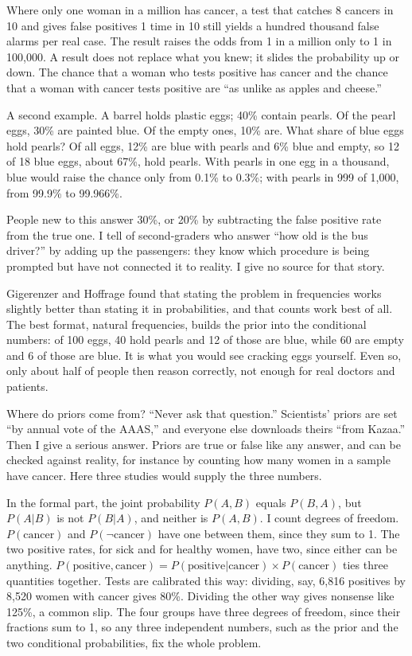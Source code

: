 Where only one woman in a million has cancer, a test that catches 8 cancers in 10 and gives false positives 1 time in 10 still yields a hundred thousand false alarms per real case. The result raises the odds from 1 in a million only to 1 in 100,000. A result does not replace what you knew; it slides the probability up or down. The chance that a woman who tests positive has cancer and the chance that a woman with cancer tests positive are ``as unlike as apples and cheese.''

A second example. A barrel holds plastic eggs; 40\% contain pearls. Of the pearl eggs, 30\% are painted blue. Of the empty ones, 10\% are. What share of blue eggs hold pearls? Of all eggs, 12\% are blue with pearls and 6\% blue and empty, so 12 of 18 blue eggs, about 67\%, hold pearls. With pearls in one egg in a thousand, blue would raise the chance only from 0.1\% to 0.3\%; with pearls in 999 of 1,000, from 99.9\% to 99.966\%.

People new to this answer 30\%, or 20\% by subtracting the false positive rate from the true one. I tell of second-graders who answer ``how old is the bus driver?'' by adding up the passengers: they know which procedure is being prompted but have not connected it to reality. I give no source for that story.

Gigerenzer and Hoffrage found that stating the problem in frequencies works slightly better than stating it in probabilities, and that counts work best of all.  The best format, natural frequencies, builds the prior into the conditional numbers: of 100 eggs, 40 hold pearls and 12 of those are blue, while 60 are empty and 6 of those are blue. It is what you would see cracking eggs yourself. Even so, only about half of people then reason correctly, not enough for real doctors and patients.

Where do priors come from? ``Never ask that question.'' Scientists' priors are set ``by annual vote of the AAAS,'' and everyone else downloads theirs ``from Kazaa.'' Then I give a serious answer. Priors are true or false like any answer, and can be checked against reality, for instance by counting how many women in a sample have cancer. Here three studies would supply the three numbers. 

In the formal part, the joint probability $P(A,B)$ equals $P(B,A)$, but $P(A|B)$ is not $P(B|A)$, and neither is $P(A,B)$. I count degrees of freedom. $P(\mathrm{cancer})$ and $P(\neg\mathrm{cancer})$ have one between them, since they sum to 1. The two positive rates, for sick and for healthy women, have two, since either can be anything. $P(\mathrm{positive},\mathrm{cancer}) = P(\mathrm{positive}|\mathrm{cancer}) \times P(\mathrm{cancer})$ ties three quantities together. Tests are calibrated this way: dividing, say, 6,816 positives by 8,520 women with cancer gives 80\%. Dividing the other way gives nonsense like 125\%, a common slip. The four groups have three degrees of freedom, since their fractions sum to 1, so any three independent numbers, such as the prior and the two conditional probabilities, fix the whole problem.

